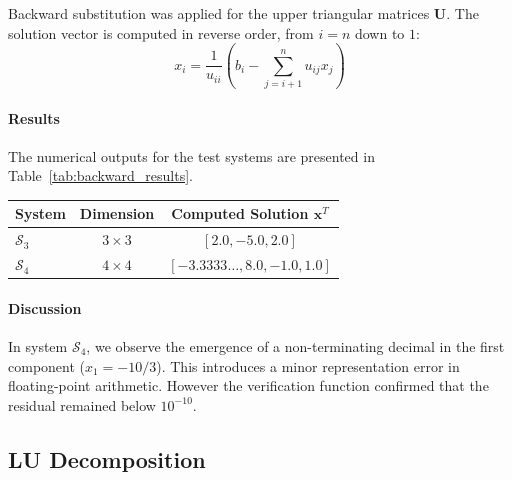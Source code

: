 \begin{solution}
	Backward substitution was applied for the upper triangular matrices
	$\mathbf{U}$. The solution vector is computed in reverse order, from $i = n$
	down to $1$:
	\[
		x_i = \frac{1}{u_{ii}} \left( b_i - \sum_{j=i+1}^{n} u_{ij} x_j \right)
	\]

	\paragraph{Results}
	The numerical outputs for the test systems are presented in
	Table~\ref{tab:backward_results}.
	\begin{center}
		\centering
		\label{tab:backward_results}
		\renewcommand{\arraystretch}{1.2}
		\begin{tabular}{lcc}
			\toprule
			System          & Dimension    & Computed Solution $\mathbf{x}^T$ \\
			\midrule
			$\mathcal{S}_3$ & $3 \times 3$ & $[2.0, -5.0, 2.0]$               \\
			$\mathcal{S}_4$ & $4 \times 4$ & $[-3.3333\dots, 8.0, -1.0, 1.0]$ \\
			\bottomrule
		\end{tabular}
	\end{center}

	\paragraph{Discussion}
	In system $\mathcal{S}_4$, we observe the emergence of a non-terminating
	decimal in the first component ($x_1 = -10/3$). This introduces a minor
	representation error in floating-point arithmetic. However the verification
	function confirmed that the residual remained below $10^{-10}$.

\end{solution}

\subsection{LU Decomposition}

